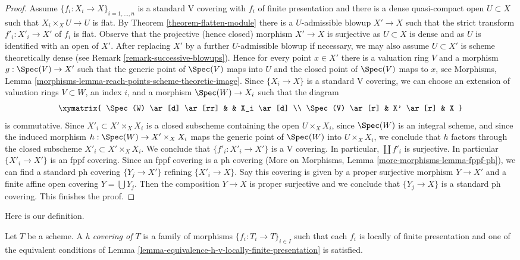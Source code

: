 \begin{proof}
\medskip\noindent
Assume $\{f_i : X_i \to X\}_{i = 1, \ldots, n}$ is a standard V covering
with $f_i$ of finite presentation and there is a dense quasi-compact open
$U \subset X$ such that $X_i \times_X U \to U$ is flat.
By Theorem \ref{theorem-flatten-module}
there is a $U$-admissible blowup $X' \to X$ such that
the strict transform $f'_i : X'_i \to X'$ of $f_i$ is flat.
Observe that the projective (hence closed) morphism $X' \to X$
is surjective as $U \subset X$ is dense and as $U$ is identified
with an open of $X'$. After replacing $X'$ by a further
$U$-admissible blowup if necessary,
we may also assume $U \subset X'$ is scheme theoretically dense
(see Remark \ref{remark-successive-blowups}).
Hence for every point $x \in X'$ there is a valuation ring $V$
and a morphism $g : \Spec(V) \to X'$ such that the generic
point of $\Spec(V)$ maps into $U$ and the closed point of
$\Spec(V)$ maps to $x$, see Morphisms, Lemma
\ref{morphisms-lemma-reach-points-scheme-theoretic-image}.
Since $\{X_i \to X\}$ is a standard V covering, we can choose
an extension of valuation rings $V \subset W$, an index $i$, and a morphism
$\Spec(W) \to X_i$ such that the diagram
$$
\xymatrix{
\Spec(W) \ar[d] \ar[rr] & & X_i \ar[d] \\
\Spec(V) \ar[r] & X' \ar[r] & X
}
$$
is commutative. Since $X'_i \subset X' \times_X X_i$ is a closed subscheme
containing the open $U \times_X X_i$, since $\Spec(W)$ is an integral scheme,
and since the induced morphism $h : \Spec(W) \to X' \times_X X_i$ maps
the generic point of $\Spec(W)$ into $U \times_X X_i$, we conclude
that $h$ factors through the closed subscheme $X'_i \subset X' \times_X X_i$.
We conclude that $\{f'_i : X'_i \to X'\}$ is a V covering.
In particular, $\coprod f'_i$ is surjective. In particular
$\{X'_i \to X'\}$ is an fppf covering. Since an fppf covering is a ph covering
(More on Morphisms, Lemma \ref{more-morphisms-lemma-fppf-ph}),
we can find a standard ph covering $\{Y_j \to X'\}$ refining
$\{X'_i \to X\}$. Say this covering is given by a proper surjective
morphism $Y \to X'$ and a finite affine open covering
$Y = \bigcup Y_j$. Then the composition $Y \to X$ is proper surjective
and we conclude that $\{Y_j \to X\}$ is a standard ph covering.
This finishes the proof.
\end{proof}

\noindent
Here is our definition.

\begin{definition}
\label{definition-h-covering}
Let $T$ be a scheme. A {\it h covering of $T$} is a family of morphisms
$\{f_i : T_i \to T\}_{i \in I}$ such that each $f_i$ is
locally of finite presentation and one of the equivalent conditions of
Lemma \ref{lemma-equivalence-h-v-locally-finite-presentation} is satisfied.
\end{definition}

